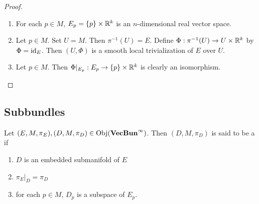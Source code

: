 \documentclass{book}
\begin{document}
\begin{proof}\
\begin{enumerate}
\item For each $p \in M$, $E_p = \{p\} \times \mathbb{R}^k$ is an $n$-dimensional real vector space.
\item Let $p \in M$. Set $U = M$. Then $\pi^{-1}(U) = E$. Define $\Phi: \pi^{-1}(U) \rightarrow U \times \mathbb{R}^k$ by $\Phi = \operatorname{id}_E$. Then $(U, \Phi)$ is a smooth local trivialization of $E$ over $U$.   
\item Let $p \in M$. Then $\Phi|_{E_p}: E_p \rightarrow \{p\} \times \mathbb{R}^k$ is clearly an isomorphism. 
\end{enumerate}
\end{proof}
















































\subsection{Subbundles}


\begin{defn}
	Let $(E, M, \pi_E), (D, M, \pi_D) \in \operatorname{Obj}(\operatorname*{\text{\textbf{VecBun}}^{\infty}})$. Then $(D, M, \pi_D)$ is said to be a  if 
	\begin{enumerate}
		\item $D$ is an embedded submanifold of $E$
		\item $\pi_E|_D = \pi_D$
		\item for each $p \in M$, $D_p$ is a subspace of $E_p$.
	\end{enumerate}
\end{defn}
\end{document}
